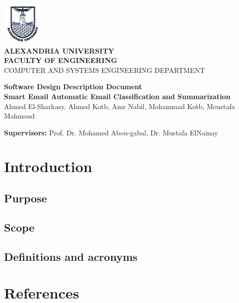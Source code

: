 \documentclass[12pt]{article}
\begin{document}
\begin{titlepage}
\vspace{-1.5cm}
\begin{center}
\includegraphics[width=2cm]{Logo_Alexandria_University.jpg}\\
\vspace{1cm}
\textbf{\large ALEXANDRIA UNIVERSITY} \\
\textbf{FACULTY OF ENGINEERING} \\
{\small  COMPUTER AND SYSTEMS ENGINEERING DEPARTMENT}

\vspace{2.5cm}
\textbf{\LARGE Software Design Description Document}\\
\textbf{\small Smart Email Automatic Email Classification and Summarization}\\
\vspace{1cm}
{ Ahmed El-Sharkasy, Ahmed Kotb, Amr Nabil, Mohammad Kotb, Moustafa Mahmoud }
\end{center}

\vspace{1ex}
\textbf{Supervisors:} Prof. Dr. Mohamed Abou-gabal, Dr. Mustafa ElNainay
\end{titlepage}

\newpage
\tableofcontents
\newpage

\section{Introduction}
\subsection{Purpose}
\subsection{Scope}
\subsection{Definitions and acronyms}

\section{References}
\end{document}
